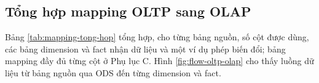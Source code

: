 \subsection{Tổng hợp mapping OLTP sang OLAP}\label{sec:mapping-tong-hop}
Bảng \ref{tab:mapping-tong-hop} tổng hợp, cho từng bảng nguồn, số cột được dùng, các bảng dimension và fact nhận dữ liệu và một ví dụ phép biến đổi; bảng mapping đầy đủ từng cột ở Phụ lục C. Hình \ref{fig:flow-oltp-olap} cho thấy luồng dữ liệu từ bảng nguồn qua ODS đến từng dimension và fact.


